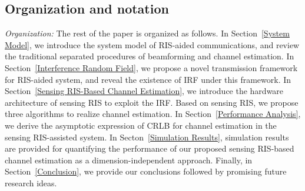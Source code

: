 \documentclass[12pt,draftclsnofoot,journal,onecolumn]{IEEEtran}
\theoremstyle{nonumberplain}
\begin{document}
\begin{itemize}
    \end{itemize}

\subsection{Organization and notation}

\textit{Organization:}
The rest of the paper is organized as follows.
In Section~\ref{System Model}, we introduce the system model of RIS-aided communications, and review the traditional separated procedures of beamforming and channel estimation.
In Section~\ref{Interference Random Field}, we propose a novel transmission framework for RIS-aided system, and reveal the existence of \ac{IRF} under this framework.
In Section~\ref{Sensing RIS-Based Channel Estimation}, we introduce the hardware architecture of sensing RIS to exploit the \ac{IRF}.
Based on sensing RIS, we propose three algorithms to realize channel estimation.
In Section~\ref{Performance Analysis}, we derive the asymptotic expression of \ac{CRLB} for channel estimation in the sensing RIS-assisted system.
In Secton~\ref{Simulation Results}, simulation results are provided for quantifying the performance of our proposed sensing RIS-based channel estimation as a dimension-independent approach.
Finally, in Section~\ref{Conclusion}, we provide our conclusions followed by promising future research ideas.
\end{document}
